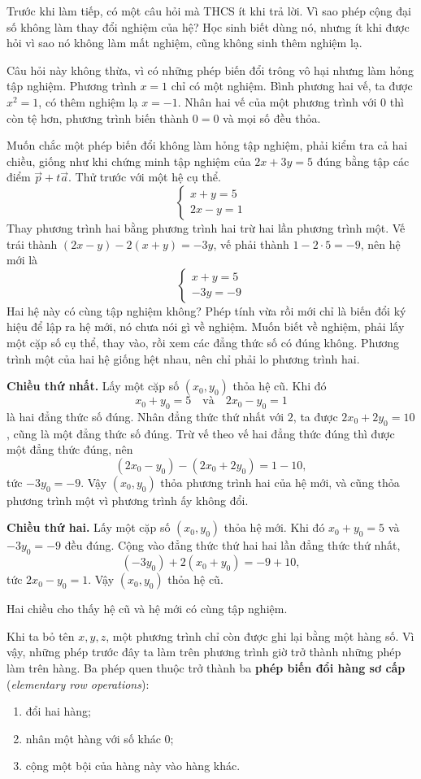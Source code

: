 \documentclass[12pt,a4paper]{article}
\begin{document}
Trước khi làm tiếp, có một câu hỏi mà THCS ít khi trả lời. Vì sao phép cộng đại số không làm thay đổi nghiệm của hệ? Học sinh biết dùng nó, nhưng ít khi được hỏi vì sao nó không làm mất nghiệm, cũng không sinh thêm nghiệm lạ.

Câu hỏi này không thừa, vì có những phép biến đổi trông vô hại nhưng làm hỏng tập nghiệm. Phương trình \(x=1\) chỉ có một nghiệm. Bình phương hai vế, ta được \(x^2=1\), có thêm nghiệm lạ \(x=-1\). Nhân hai vế của một phương trình với \(0\) thì còn tệ hơn, phương trình biến thành \(0=0\) và mọi số đều thỏa.

Muốn chắc một phép biến đổi không làm hỏng tập nghiệm, phải kiểm tra cả hai chiều, giống như khi chứng minh tập nghiệm của \(2x+3y=5\) đúng bằng tập các điểm \(\vec{p}+t\vec{a}\). Thử trước với một hệ cụ thể.
$$ \begin{cases} x+y=5\\ 2x-y=1 \end{cases} $$
Thay phương trình hai bằng phương trình hai trừ hai lần phương trình một. Vế trái thành \((2x-y)-2(x+y)=-3y\), vế phải thành \(1-2\cdot5=-9\), nên hệ mới là
$$ \begin{cases} x+y=5\\ -3y=-9 \end{cases} $$
Hai hệ này có cùng tập nghiệm không? Phép tính vừa rồi mới chỉ là biến đổi ký hiệu để lập ra hệ mới, nó chưa nói gì về nghiệm. Muốn biết về nghiệm, phải lấy một cặp số cụ thể, thay vào, rồi xem các đẳng thức số có đúng không. Phương trình một của hai hệ giống hệt nhau, nên chỉ phải lo phương trình hai.

\textbf{Chiều thứ nhất.} Lấy một cặp số \((x_0,y_0)\) thỏa hệ cũ. Khi đó
$$ x_0+y_0=5 \quad\text{và}\quad 2x_0-y_0=1 $$
là hai đẳng thức số đúng. Nhân đẳng thức thứ nhất với \(2\), ta được \(2x_0+2y_0=10\), cũng là một đẳng thức số đúng. Trừ vế theo vế hai đẳng thức đúng thì được một đẳng thức đúng, nên
$$ (2x_0-y_0)-(2x_0+2y_0)=1-10, $$
tức \(-3y_0=-9\). Vậy \((x_0,y_0)\) thỏa phương trình hai của hệ mới, và cũng thỏa phương trình một vì phương trình ấy không đổi.

\textbf{Chiều thứ hai.} Lấy một cặp số \((x_0,y_0)\) thỏa hệ mới. Khi đó \(x_0+y_0=5\) và \(-3y_0=-9\) đều đúng. Cộng vào đẳng thức thứ hai hai lần đẳng thức thứ nhất,
$$ (-3y_0)+2(x_0+y_0)=-9+10, $$
tức \(2x_0-y_0=1\). Vậy \((x_0,y_0)\) thỏa hệ cũ.

Hai chiều cho thấy hệ cũ và hệ mới có cùng tập nghiệm.

Khi ta bỏ tên \(x,y,z\), một phương trình chỉ còn được ghi lại bằng một hàng số. Vì vậy, những phép trước đây ta làm trên phương trình giờ trở thành những phép làm trên hàng. Ba phép quen thuộc trở thành ba \textbf{phép biến đổi hàng sơ cấp} (\emph{elementary row operations}):
\begin{enumerate}
  \item đổi hai hàng;
  \item nhân một hàng với số khác \(0\);
  \item cộng một bội của hàng này vào hàng khác.
\end{enumerate}
\end{document}
